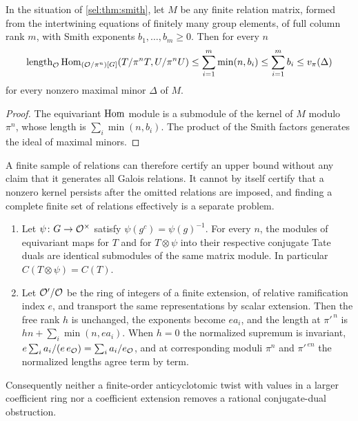 \begin{proposition}\label{sel:prop:finitecert}
In the situation of \cref{sel:thm:smith}, let $M$ be any finite relation
matrix, formed from the intertwining equations of finitely many group
elements, of full column rank $m$, with Smith exponents
$b_1,\dots,b_m\ge0$. Then for every $n$
\[
 \operatorname{length}_{\mathcal{O}}\operatorname{Hom}_{(\mathcal{O}/\pi^n)[G]}(T/\pi^nT,U/\pi^nU)
 \le\sum_{i=1}^m\min(n,b_i)\le\sum_{i=1}^mb_i\le v_\pi(\Delta)
\]
for every nonzero maximal minor $\Delta$ of $M$.
\end{proposition}

\begin{proof}
The equivariant $\operatorname{Hom}$ module is a submodule of the kernel of $M$ modulo
$\pi^n$, whose length is $\sum_i\min(n,b_i)$. The product of the Smith
factors generates the ideal of maximal minors.
\end{proof}

A finite sample of relations can therefore certify an upper bound without
any claim that it generates all Galois relations. It cannot by itself
certify that a nonzero kernel persists after the omitted relations are
imposed, and finding a complete finite set of relations effectively is a
separate problem.

\begin{proposition}\label{sel:prop:invariance}
\leavevmode
\begin{enumerate}[label=\textup{(\roman*)}]
\item Let $\psi\colon G\to\mathcal{O}^\times$ satisfy $\psi(g^c)=\psi(g)^{-1}$. For
every $n$, the modules of equivariant maps for $T$ and for $T\otimes\psi$
into their respective conjugate Tate duals are identical submodules of the
same matrix module. In particular $C(T\otimes\psi)=C(T)$.
\item Let $\mathcal{O}'/\mathcal{O}$ be the ring of integers of a finite extension, of
relative ramification index $e$, and transport the same representations by
scalar extension. Then the free rank $h$ is unchanged, the exponents become
$ea_i$, and the length at $\pi'^{\,n}$ is $hn+\sum_i\min(n,ea_i)$. When
$h=0$ the normalized supremum is invariant,
$e\sum_ia_i/(e\,e_{\mathcal{O}})=\sum_ia_i/e_{\mathcal{O}}$, and at corresponding moduli
$\pi^n$ and $\pi'^{\,en}$ the normalized lengths agree term by term.
\end{enumerate}
Consequently neither a finite-order anticyclotomic twist with values in a
larger coefficient ring nor a coefficient extension removes a rational
conjugate-dual obstruction.
\end{proposition}

